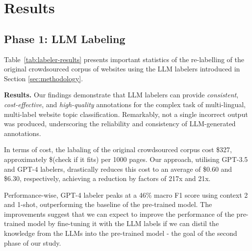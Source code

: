 \section{Results}

\subsection*{Phase 1: LLM Labeling}



Table~\ref{tab:labeler-results} presents important statistics of the re-labelling of the original crowdsourced corpus of websites using the LLM labelers introduced in Section \ref{sec:methodology}.

\textbf{Results.} Our findings demonstrate that LLM labelers can provide \textit{consistent}, \textit{cost-effective}, and \textit{high-quality} annotations for the complex task of multi-lingual, multi-label website topic classification. 
Remarkably, not a single incorrect output was produced, underscoring the reliability and consistency of LLM-generated annotations.

In terms of cost, the labaling of the original crowdsourced corpus cost \$327, approximately \$(check if it fits) per 1000 pages.
Our approach, utilising GPT-3.5 and GPT-4 labelers, drastically reduces this cost to an average of
 \$0.60 and \$6.30, respectively, achieving a reduction by factors of 217x and 21x.






Performance-wise, GPT-4 labeler peaks at a 46\% macro F1 score using context 2 and 1-shot, outperforming the baseline of the pre-trained model. 
The improvements suggest that we can expect to improve the performance of the pre-trained model by fine-tuning it with the LLM labels if we can distil the knowledge from the LLMs into the pre-trained model - the goal of the second phase of our study.


